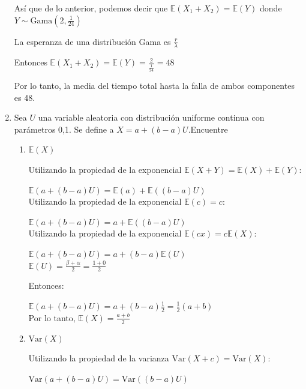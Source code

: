 \documentclass[11pt,a4paper]{report}
\begin{document}
\begin{enumerate}
{			Así que de lo anterior, podemos decir que  $\mathbb{E}(X_{1} + X_{2}) = \mathbb{E}(Y)$ donde $Y \sim \text{Gama}(2, \frac{1}{24})$
			
			La esperanza de una distribución Gama es $\frac{r}{\lambda}$
			
			Entonces $\mathbb{E}(X_{1} + X_{2}) = \mathbb{E}(Y) = \frac{2}{\frac{1}{24}} = 48$
			
			Por lo tanto, la media del tiempo total hasta la
			falla de ambos componentes es 48.\\
		}

		\item{
			Sea $U$ una variable aleatoria con distribución uniforme continua
			con parámetros 0,1. Se define a $X = a+(b - a)U$.Encuentre
			\begin{enumerate}
				\item {
					$\mathbb{E}(X)$
					
					Utilizando la propiedad de la exponencial $\mathbb{E}(X + Y) = \mathbb{E}(X) + \mathbb{E}(Y)$:
					
					$\mathbb{E}(a+(b - a)U) = \mathbb{E}(a) + \mathbb{E}((b - a)U)$\\
					
					Utilizando la propiedad de la exponencial $\mathbb{E}(c) = c$:
					
					$\mathbb{E}(a+(b - a)U) = a + \mathbb{E}((b - a)U)$\\
					
					Utilizando la propiedad de la exponencial $\mathbb{E}(cx) = c\mathbb{E}(X)$:
					
					$\mathbb{E}(a+(b - a)U) = a + (b - a)\mathbb{E}(U)$\\
					
					$\mathbb{E}(U) = \frac{\beta + \alpha}{2} = \frac{1+0}{2}$
					
					Entonces:
					
					$\mathbb{E}(a+(b - a)U) = a + (b - a)\frac{1}{2} = \frac{1}{2}(a+b)$\\

					
					Por lo tanto, $\mathbb{E}(X) = \frac{a+b}{2}$\\
						
					
				}

				\item {
					$\text{Var}(X)$
					
					Utilizando la propiedad de la varianza $\text{Var}(X + c) = \text{Var}(X)$:
					
					$\text{Var}(a+(b - a)U) = \text{Var}((b - a)U)$\\
					
}
\end{enumerate}}
\end{enumerate}
\end{document}
